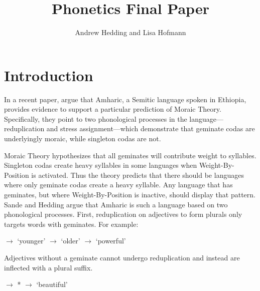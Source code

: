 \documentclass[12pt]{article}
\title{Phonetics Final Paper}
\author{Andrew Hedding and Lisa Hofmann}
\begin{document}
\maketitle
\section{Introduction}

In a recent paper, \cite{sande-hedding14} argue that Amharic, a Semitic language spoken in Ethiopia, provides evidence to support a particular prediction of Moraic Theory. Specifically, they point to two phonological processes in the language---reduplication and stress assignment---which demonstrate that geminate codas are underlyingly moraic, while singleton codas are not. 

Moraic Theory hypothesizes that all geminates will contribute weight to syllables. Singleton codas create heavy syllables in some languages when Weight-By-Position is activated. Thus the theory predicts that there should be languages where only geminate codas create a heavy syllable. Any language that has geminates, but where Weight-By-Position is inactive, should display that pattern. Sande and Hedding argue that Amharic is such a language based on two phonological processes. First, reduplication on adjectives to form plurals only targets words with geminates. For example:

\begin{exe}
\begin{xlist}
\ex 	{} $\rightarrow$  \hspace{1cm} `younger'
\ex 	{} $\rightarrow$  \hspace{1.18cm} `older'
\ex 	{} $\rightarrow$  \hspace{1.37cm} `powerful'
\end{xlist}
\end{exe}

Adjectives without a geminate cannot undergo reduplication and instead are inflected with a plural suffix. 

\begin{exe}
\begin{xlist}
\ex 	{} $\rightarrow$ * 
\ex 	{} $\rightarrow$  \hspace{1cm} `beautiful'
\end{xlist}
\end{exe}
\end{document}
